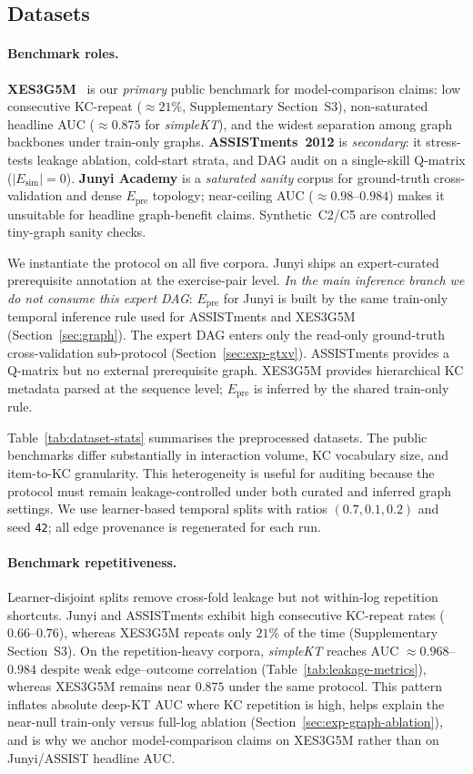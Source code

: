 \documentclass[pdflatex,sn-mathphys-num]{sn-jnl}
\newcommand{\Epre}{\ensuremath{E_{\text{pre}}}}
\newcommand{\Esim}{\ensuremath{E_{\text{sim}}}}
\begin{document}
\subsection{Datasets}
\label{sec:datasets}
\paragraph{Benchmark roles.}
\textbf{XES3G5M}~\cite{xes3g5m2023} is our \emph{primary} public benchmark for
model-comparison claims: low consecutive KC-repeat (${\approx}21\%$,
Supplementary Section~S3), non-saturated headline AUC (${\approx}0.875$ for
\textit{simpleKT}), and the widest separation among graph backbones under
train-only graphs. \textbf{ASSISTments~2012} is \emph{secondary}: it
stress-tests leakage ablation, cold-start strata, and DAG audit on a
single-skill Q-matrix ($|\Esim|{=}0$). \textbf{Junyi Academy}
\cite{junyi_dataset} is a \emph{saturated sanity} corpus for ground-truth
cross-validation and dense $\Epre$ topology; near-ceiling AUC
(${\approx}0.98$--$0.984$) makes it unsuitable for headline graph-benefit
claims. Synthetic~C2/C5 are controlled tiny-graph sanity checks.

We instantiate the protocol on all five corpora. Junyi ships an
expert-curated prerequisite annotation at the exercise-pair level.
\emph{In the main inference branch we do not consume this expert DAG}:
$\Epre$ for Junyi is built by the same train-only temporal inference rule
used for ASSISTments and XES3G5M (Section~\ref{sec:graph}). The expert DAG
enters only the read-only ground-truth cross-validation sub-protocol
(Section~\ref{sec:exp-gtxv}). ASSISTments provides a Q-matrix but no
external prerequisite graph. XES3G5M provides hierarchical KC metadata parsed
at the sequence level; $\Epre$ is inferred by the shared train-only rule.

Table~\ref{tab:dataset-stats} summarises the preprocessed datasets.
The public benchmarks differ substantially in interaction volume, KC
vocabulary size, and item-to-KC granularity. This heterogeneity is
useful for auditing because the protocol must remain leakage-controlled
under both curated and inferred graph settings. We use learner-based
temporal splits with ratios $(0.7,0.1,0.2)$ and seed \texttt{42}; all
edge provenance is regenerated for each run.
\paragraph{Benchmark repetitiveness.}
\label{sec:exp-autocorr}
Learner-disjoint splits remove cross-fold leakage but not within-log
repetition shortcuts. Junyi and ASSISTments exhibit high consecutive
KC-repeat rates ($0.66$--$0.76$), whereas XES3G5M repeats only $21\%$ of the
time (Supplementary Section~S3). On the repetition-heavy corpora,
\textit{simpleKT} reaches AUC ${\approx}0.968$--$0.984$ despite weak
edge--outcome correlation (Table~\ref{tab:leakage-metrics}), whereas XES3G5M
remains near $0.875$ under the same protocol. This pattern inflates absolute
deep-KT AUC where KC repetition is high, helps explain the near-null
train-only versus full-log ablation (Section~\ref{sec:exp-graph-ablation}),
and is why we anchor model-comparison claims on XES3G5M rather than on
Junyi/ASSIST headline AUC.
\end{document}
